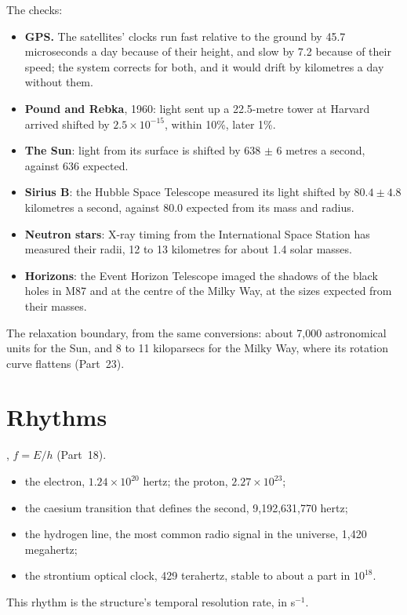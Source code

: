 \documentclass[11pt,a4paper]{article}
\begin{document}
The checks:
\begin{itemize}
\item \textbf{GPS.} The satellites' clocks run fast relative to the ground by 45.7 microseconds a day because of their height, and slow by 7.2 because of their speed; the system corrects for both, and it would drift by kilometres a day without them.
\item \textbf{Pound and Rebka}, 1960: light sent up a 22.5-metre tower at Harvard arrived shifted by $2.5\times10^{-15}$, within 10\%, later 1\%.
\item \textbf{The Sun}: light from its surface is shifted by 638 $\pm$ 6 metres a second, against 636 expected.
\item \textbf{Sirius B}: the Hubble Space Telescope measured its light shifted by $80.4\pm4.8$ kilometres a second, against 80.0 expected from its mass and radius.
\item \textbf{Neutron stars}: X-ray timing from the International Space Station has measured their radii, 12 to 13 kilometres for about 1.4 solar masses.
\item \textbf{Horizons}: the Event Horizon Telescope imaged the shadows of the black holes in M87 and at the centre of the Milky Way, at the sizes expected from their masses.
\end{itemize}
The relaxation boundary, from the same conversions: about 7,000 astronomical units for the Sun, and 8 to 11 kiloparsecs for the Milky Way, where its rotation curve flattens (Part~23).

\section{Rhythms}
\label{sec:rhythms}

, $f=E/h$ (Part~18).
\begin{itemize}
\item the electron, $1.24\times10^{20}$ hertz; the proton, $2.27\times10^{23}$;
\item the caesium transition that defines the second, 9,192,631,770 hertz;
\item the hydrogen line, the most common radio signal in the universe, 1,420 megahertz;
\item the strontium optical clock, 429 terahertz, stable to about a part in $10^{18}$.
\end{itemize}
This rhythm is the structure's temporal resolution rate, in s$^{-1}$.
\end{document}
